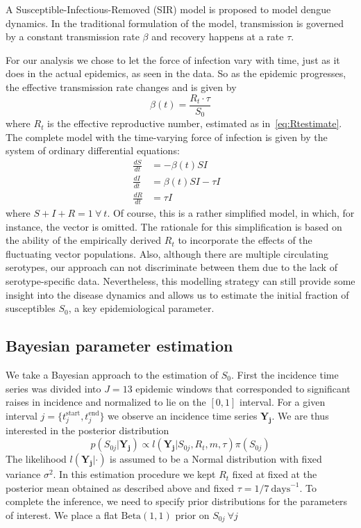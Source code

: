 \documentclass[10pt]{article}
\begin{document}
A Susceptible-Infectious-Removed (SIR) model is proposed to model dengue 
dynamics.
In the traditional formulation of the model, transmission is governed by a 
constant transmission rate $\beta$ and recovery happens at a rate $\tau$.

For our analysis we chose to let the force of infection vary with time, just 
as it does in the actual epidemics, as seen in the data. So as the epidemic 
progresses, the effective transmission  rate changes and is 
given by 
\begin{equation} 
 \label{eq:effbeta}
 \beta(t) = \frac{R_t\cdot\tau}{S_0}
\end{equation}
where $R_t$ is the effective reproductive number, estimated as 
in~\ref{eq:Rtestimate}.
The complete model with the time-varying force of infection is given by
the system of ordinary differential equations:
\begin{align}
   \label{eq:model}
 \frac{dS}{dt} &= -\beta(t)SI \\     \nonumber
 \frac{dI}{dt} &= \beta(t)SI - \tau I&\\      \nonumber
 \frac{dR}{dt} &= \tau I&
\end{align}  
where $S + I + R = 1 \: \forall\: t$. %
Of course, this is a rather simplified model, in which, for instance, the 
vector is omitted.
The rationale for this simplification is based on the ability of the 
empirically derived $R_t$  to incorporate the effects of the fluctuating vector 
populations.
Also, although there are multiple circulating serotypes, our approach
can not discriminate between them due to the lack of serotype-specific data.
Nevertheless, this modelling strategy can still provide some insight into the 
disease dynamics and allows us to estimate the initial fraction of susceptibles 
$S_0$, a key epidemiological parameter.

\subsection*{Bayesian parameter estimation}

We take a Bayesian approach to the estimation of $S_0$.
First the incidence time series was divided into $J=13$ 
epidemic windows that corresponded to significant raises in incidence and 
normalized to lie on the $[0,1]$ interval.
For a given interval $j = \{ t_j^{\text{start}}, t_j^{\text{end}} \} $ we 
observe an incidence time series $\mathbf{Y_{j}}$.
We are thus interested in the posterior distribution
\begin{equation}
 \label{eq:S0post}
 p(S_{0j}|\mathbf{Y_{j}}) \propto l(\mathbf{Y_{j}}|S_{0j}, R_t, m, \tau 
)\pi(S_{0j}) 
\end{equation}
The likelihood $l(\mathbf{Y_{j}}|\cdot)$ is assumed to be a Normal distribution 
with fixed variance $\sigma^2$.
In this estimation procedure we kept $R_t$ fixed at fixed at the posterior mean 
obtained as described above and fixed $\tau = 1/7\: \text{days}^{-1}$.
To complete the inference, we need to specify prior distributions for the 
parameters of interest.
We place a flat $\text{Beta}(1, 1)$ prior on $S_{0j}\:\forall j$
\end{document}
